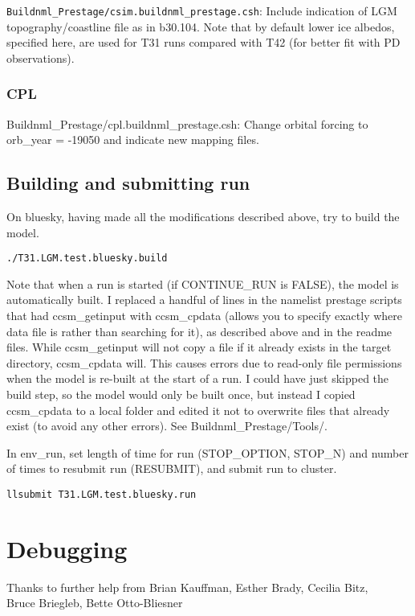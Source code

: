 \documentclass[authoryear,round,12pt]{article}
\begin{document}
\verb+Buildnml_Prestage/csim.buildnml_prestage.csh+: Include
indication of LGM topography/coastline file as in b30.104. Note that
by default lower ice albedos, specified here, are used for T31 runs
compared with T42 (for better fit with PD observations).

\subsubsection{CPL}

Buildnml{\_}Prestage/cpl.buildnml{\_}prestage.csh: Change orbital
forcing to orb{\_}year = -19050 and indicate new mapping files.

\subsection{Building and submitting run}
\label{sec:building}

On bluesky, having made all the modifications described above, try to
build the model.
\begin{verbatim}
./T31.LGM.test.bluesky.build
\end{verbatim}

Note that when a run is started (if CONTINUE\_RUN is FALSE), the model
is automatically built. I replaced a handful of lines in the namelist
prestage scripts that had ccsm\_getinput with ccsm\_cpdata (allows you
to specify exactly where data file is rather than searching for it),
as described above and in the readme files. While ccsm\_getinput will
not copy a file if it already exists in the target directory,
ccsm\_cpdata will. This causes errors due to read-only file
permissions when the model is re-built at the start of a run. I could
have just skipped the build step, so the model would only be built
once, but instead I copied ccsm\_cpdata to a local folder and edited
it not to overwrite files that already exist (to avoid any other
errors). See Buildnml{\_}Prestage/Tools/.

In env\_run, set length of time for run (STOP\_OPTION, STOP\_N) and
number of times to resubmit run (RESUBMIT), and submit run to cluster.
\begin{verbatim}
llsubmit T31.LGM.test.bluesky.run
\end{verbatim}

\section{Debugging}

\begin{center}
Thanks to further help from Brian Kauffman, Esther Brady, Cecilia Bitz,\\ 
Bruce Briegleb, Bette Otto-Bliesner
\end{center}
\end{document}
